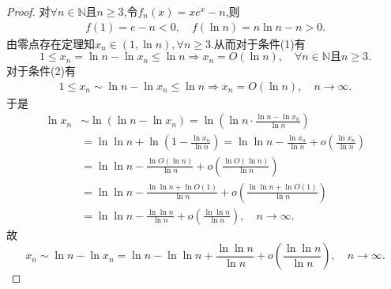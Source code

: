\documentclass[../../main.tex]{subfiles}%
\begin{document}
\begin{proof}
对$\forall n\in \mathbb{N}$且$n\geqslant 3$,令$f_n(x) = xe^{x}-n$,则
\begin{align*}
f(1)=e-n<0,\quad f(\ln n)=n\ln n-n>0.
\end{align*}
由零点存在定理知$x_n\in (1,\ln n),\forall n\geqslant 3$.从而对于条件(1)有
\[
1 \leqslant x_n = \ln n - \ln x_n \leqslant \ln n \Rightarrow x_n = O(\ln n), \quad \forall n\in \mathbb{N}\text{且}n\geqslant 3.
\]
对于条件(2)有
\begin{align*}
1 \leqslant x_n \sim \ln n - \ln x_n \leqslant \ln n \Rightarrow x_n = O(\ln n),\quad  n\to \infty.
\end{align*}
于是
\begin{align}
\ln x_n&\sim \ln \left( \ln n-\ln x_n \right) =\ln \left( \ln n\cdot \frac{\ln n-\ln x_n}{\ln n} \right)\nonumber\\
&=\ln\ln n+\ln \left( 1-\frac{\ln x_n}{\ln n} \right) =\ln\ln n-\frac{\ln x_n}{\ln n}+o\left( \frac{\ln x_n}{\ln n} \right)\nonumber\\
&=\ln\ln n-\frac{\ln O(\ln n)}{\ln n}+o\left( \frac{\ln O(\ln n)}{\ln n} \right)\nonumber\\
&=\ln\ln n-\frac{\ln\ln n+\ln O(1)}{\ln n}+o\left( \frac{\ln\ln n+\ln O(1)}{\ln n} \right)\nonumber\\
&=\ln\ln n-\frac{\ln\ln n}{\ln n}+o\left( \frac{\ln\ln n}{\ln n} \right) ,\quad n\to \infty.\label{eq::F---HIOUHJWOFHJIOJWIUIOU89389423789}
\end{align}
故
\[
x_n \sim\ln n-\ln x_n= \ln n - \ln \ln n + \frac{\ln \ln n}{\ln n} + o\left( \frac{\ln \ln n}{\ln n} \right),\quad n\to \infty.
\]


\end{proof}
\end{document}
